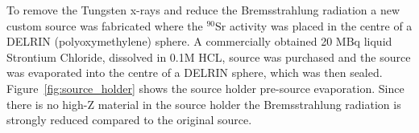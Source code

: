 \documentclass[cnatzke_thesis_proposal.tex]{subfiles}
\begin{document}
To remove the Tungsten x-rays and reduce the Bremsstrahlung radiation a new custom source was fabricated where the $^{90}$Sr activity was placed in the centre of a DELRIN (polyoxymethylene) sphere. 
A commercially obtained 20 MBq liquid Strontium Chloride, dissolved in 0.1M HCL, source was purchased and the source was evaporated into the centre of a DELRIN sphere, which was then sealed. 
Figure~\ref{fig:source_holder} shows the source holder pre-source evaporation. 
Since there is no high-Z material in the source holder the Bremsstrahlung radiation is strongly reduced compared to the original source. 




\end{document}

